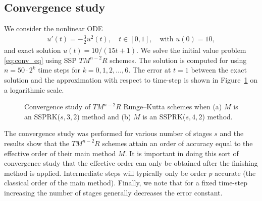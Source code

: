 \subsection{Convergence study}\label{subsec:convergence}
We consider the nonlinear ODE
\begin{align}\label{eq:conv_eq}
    u'(t) = -\frac{3}{2}u^{2}(t), \quad t \in [0,1], \quad \text{with } u(0) = 10,
\end{align}
and exact solution $u(t) = 10/(15t + 1)$.
We solve the initial value problem \eqref{eq:conv_eq}
using SSP $TM^{n-2}R$ schemes.
The solution is computed for using $n = 50 \cdot 2^{k}$ time steps for
$k = 0, 1, 2, \dots, 6$.
The error at $t=1$ between the exact solution and the approximation with 
respect to time-step is shown in Figure~\ref{fig:conv_study} on a logarithmic 
scale.
\begin{figure}
	\centering
   \quad
    \caption{Convergence study of $TM^{n-2}R$ Runge--Kutta schemes when (a) $M$
    is an SSPRK($s,3,2$) method and (b) $ M $ is an SSPRK($s,4,2$) method.}
    \label{fig:conv_study}
\end{figure}
The convergence study was performed for various number of stages $s$ and 
the results show that the $TM^{n-2}R$ schemes attain an order of accuracy equal
to the effective order of their main method $M$.
It is important in doing this sort of convergence study that the
effective order can only be obtained after the finishing method is
applied.
Intermediate steps will typically only be order $p$ accurate (the classical
order of the main method).
Finally, we note that for a fixed time-step increasing the number of stages
generally decreases the error constant.

